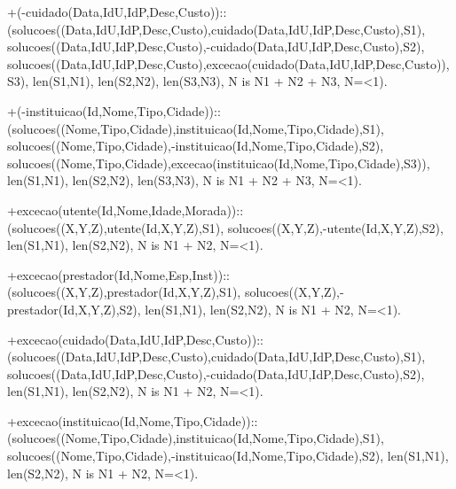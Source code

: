 \documentclass{article}
\begin{document}
\begin{spverbatim}
+(-cuidado(Data,IdU,IdP,Desc,Custo))::
           (solucoes((Data,IdU,IdP,Desc,Custo),cuidado(Data,IdU,IdP,Desc,Custo),S1),
            solucoes((Data,IdU,IdP,Desc,Custo),-cuidado(Data,IdU,IdP,Desc,Custo),S2),
            solucoes((Data,IdU,IdP,Desc,Custo),excecao(cuidado(Data,IdU,IdP,Desc,Custo)),S3),
            len(S1,N1),
            len(S2,N2),
            len(S3,N3),
            N is N1 + N2 + N3,
            N=<1).

+(-instituicao(Id,Nome,Tipo,Cidade))::
            (solucoes((Nome,Tipo,Cidade),instituicao(Id,Nome,Tipo,Cidade),S1),
            solucoes((Nome,Tipo,Cidade),-instituicao(Id,Nome,Tipo,Cidade),S2),
            solucoes((Nome,Tipo,Cidade),excecao(instituicao(Id,Nome,Tipo,Cidade),S3)),
            len(S1,N1),
            len(S2,N2),
            len(S3,N3),
            N is N1 + N2 + N3,
            N=<1).

+excecao(utente(Id,Nome,Idade,Morada))::(solucoes((X,Y,Z),utente(Id,X,Y,Z),S1),
                                         solucoes((X,Y,Z),-utente(Id,X,Y,Z),S2),
                                         len(S1,N1),
                                         len(S2,N2),
                                         N is N1 + N2,
                                         N=<1).

+excecao(prestador(Id,Nome,Esp,Inst))::(solucoes((X,Y,Z),prestador(Id,X,Y,Z),S1),
                                        solucoes((X,Y,Z),-prestador(Id,X,Y,Z),S2),
                                        len(S1,N1),
                                        len(S2,N2),
                                        N is N1 + N2,
                                        N=<1).

+excecao(cuidado(Data,IdU,IdP,Desc,Custo))::
               (solucoes((Data,IdU,IdP,Desc,Custo),cuidado(Data,IdU,IdP,Desc,Custo),S1),
               solucoes((Data,IdU,IdP,Desc,Custo),-cuidado(Data,IdU,IdP,Desc,Custo),S2),
               len(S1,N1),
               len(S2,N2),
               N is N1 + N2,
               N=<1).

+excecao(instituicao(Id,Nome,Tipo,Cidade))::
               (solucoes((Nome,Tipo,Cidade),instituicao(Id,Nome,Tipo,Cidade),S1),
               solucoes((Nome,Tipo,Cidade),-instituicao(Id,Nome,Tipo,Cidade),S2),
               len(S1,N1),
               len(S2,N2),
               N is N1 + N2,
               N=<1).
\end{spverbatim}
\end{document}
